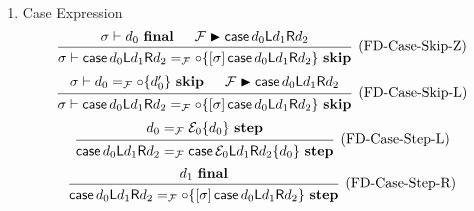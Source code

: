 \documentclass{article}
\newcommand{\entails}{\mathrel{\mathop{\vdash}}}
\newcommand{\skips}{\mathrel{\mathop{\blacktriangleright}}}
\newcommand{\final}{~\mathbf{final}}
\newcommand{\istep}{~\mathbf{step}}
\newcommand{\iskip}{~\mathbf{skip}}
\newcommand{\fcase}{\operatorname{\mathsf{case}}}
\newcommand{\fcaseL}{\mathsf{L}}
\newcommand{\fcaseR}{\mathsf{R}}
\begin{document}
\begin{enumerate}
\begin{enumerate}
      \item Case Expression
        \[
          \begin{prooftree}
            \hypo{\sigma \entails d_0 \final}
            \hypo{\mathcal{F} \skips \fcase d_0 \fcaseL d_1 \fcaseR d_2}
            \infer2[(FD-Case-Skip-Z)]{
              \sigma \entails
              \fcase d_0 \fcaseL d_1 \fcaseR d_2
              =_\mathcal{F}
              \circ \{ [\sigma] \fcase d_0 \fcaseL d_1 \fcaseR d_2 \} \iskip
            }
          \end{prooftree}
        \]
        \[
          \begin{prooftree}
            \hypo{\sigma \entails d_0 =_\mathcal{F} \circ \{ d_0' \} \iskip}
            \hypo{\mathcal{F} \skips \fcase d_0 \fcaseL d_1 \fcaseR d_2}
            \infer2[(FD-Case-Skip-L)]{
              \sigma \entails
              \fcase d_0 \fcaseL d_1 \fcaseR d_2
              =_\mathcal{F}
              \circ \{ [\sigma] \fcase d_0 \fcaseL d_1 \fcaseR d_2 \} \iskip
            }
          \end{prooftree}
        \]
        \[
          \begin{prooftree}
            \hypo{d_0 =_\mathcal{F} \mathcal{E}_{0} \{ d_0 \} \istep}
            \infer1[(FD-Case-Step-L)]{
              \fcase d_0 \fcaseL d_1 \fcaseR d_2
              =_\mathcal{F}
              \fcase \mathcal{E}_{0} \fcaseL d_1 \fcaseR d_2 \{ d_0 \} \istep
            }
          \end{prooftree}
        \]
        \[
          \begin{prooftree}
            \hypo{d_1 \final}
            \infer1[(FD-Case-Step-R)]{
              \fcase d_0 \fcaseL d_1 \fcaseR d_2
              =_\mathcal{F}
              \circ \{ [\sigma] \fcase d_0 \fcaseL d_1 \fcaseR d_2 \} \istep
            }
          \end{prooftree}
        \]


\end{enumerate}
\end{enumerate}
\end{document}
